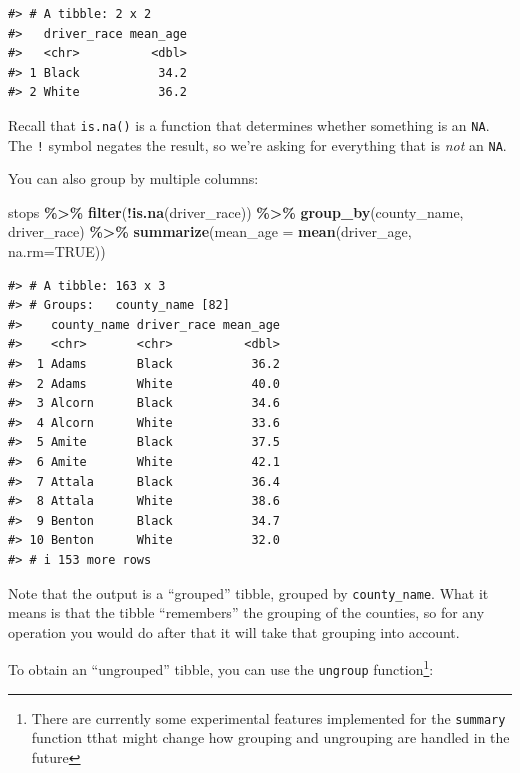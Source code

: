 \documentclass[
]{book}
\newenvironment{Shaded}{\begin{snugshade}}{\end{snugshade}}
\newcommand{\AttributeTok}[1]{\textcolor[rgb]{0.13,0.29,0.53}{#1}}
\newcommand{\ConstantTok}[1]{\textcolor[rgb]{0.56,0.35,0.01}{#1}}
\newcommand{\FunctionTok}[1]{\textcolor[rgb]{0.13,0.29,0.53}{\textbf{#1}}}
\newcommand{\NormalTok}[1]{#1}
\newcommand{\SpecialCharTok}[1]{\textcolor[rgb]{0.81,0.36,0.00}{\textbf{#1}}}
\begin{document}
\begin{verbatim}
#> # A tibble: 2 x 2
#>   driver_race mean_age
#>   <chr>          <dbl>
#> 1 Black           34.2
#> 2 White           36.2
\end{verbatim}

Recall that \texttt{is.na()} is a function that determines whether something is an \texttt{NA}. The \texttt{!} symbol negates the result, so we're asking for everything that is \emph{not} an \texttt{NA}.

You can also group by multiple columns:

\begin{Shaded}
\begin{Highlighting}[]
\NormalTok{stops }\SpecialCharTok{\%\textgreater{}\%} 
  \FunctionTok{filter}\NormalTok{(}\SpecialCharTok{!}\FunctionTok{is.na}\NormalTok{(driver\_race)) }\SpecialCharTok{\%\textgreater{}\%}
  \FunctionTok{group\_by}\NormalTok{(county\_name, driver\_race) }\SpecialCharTok{\%\textgreater{}\%}
  \FunctionTok{summarize}\NormalTok{(}\AttributeTok{mean\_age =} \FunctionTok{mean}\NormalTok{(driver\_age, }\AttributeTok{na.rm=}\ConstantTok{TRUE}\NormalTok{))}
\end{Highlighting}
\end{Shaded}

\begin{verbatim}
#> # A tibble: 163 x 3
#> # Groups:   county_name [82]
#>    county_name driver_race mean_age
#>    <chr>       <chr>          <dbl>
#>  1 Adams       Black           36.2
#>  2 Adams       White           40.0
#>  3 Alcorn      Black           34.6
#>  4 Alcorn      White           33.6
#>  5 Amite       Black           37.5
#>  6 Amite       White           42.1
#>  7 Attala      Black           36.4
#>  8 Attala      White           38.6
#>  9 Benton      Black           34.7
#> 10 Benton      White           32.0
#> # i 153 more rows
\end{verbatim}

Note that the output is a ``grouped'' tibble, grouped by \texttt{county\_name}. What it means is that the tibble ``remembers'' the grouping of the counties, so for any operation you would do after that it will take that grouping into account.

To obtain an ``ungrouped'' tibble, you can use the \texttt{ungroup} function\footnote{There are currently some experimental features implemented for the \texttt{summary} function tthat might change how grouping and ungrouping are handled in the future}:
\end{document}
